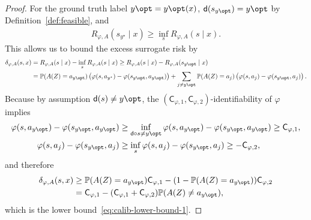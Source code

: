 \documentclass[11pt]{article}
\newcommand{\Prb}{\mathbb{P}}
\newcommand{\prn}[1]{\left({#1}\right)} %
\newcommand{\constant}{\mathsf{C}}  %
\newcommand{\pred}{\mathsf{d}}  %
\newcommand{\sloss}{\varphi}  %
\begin{document}
\begin{proof}
  For the ground truth label $y\opt = y\opt(x)$,
  $\pred(s_{y\opt}) = y\opt$ by Definition~\ref{def:feasible},
  and
  \begin{align*}
    R_{\varphi,A}(s_{y^\star} \mid x) \geq \inf_{s} R_{\varphi,A}(s \mid x).
  \end{align*} 
  This allows us to bound the excess surrogate risk by
  \begin{align*}
    \delta_{\sloss, A} (s, x)
    & = R_{\varphi,A}(s\mid x) - \inf_{s} R_{\varphi,A}(s \mid x)
    \geq R_{\varphi,A}(s\mid x) - R_{\varphi,A}(s_{y\opt} \mid x) \\
    & = \Prb(A(Z) = a_{y\opt}) \prn{\varphi(s, a_{y^\star}) -
      \varphi(s_{y\opt}, a_{y\opt})} + \sum_{j \neq y\opt}  \Prb(A(Z) = a_j) \prn{\varphi(s, a_j) - \varphi(s_{y\opt}, a_j)}.
  \end{align*}
  Because by assumption $\pred(s) \neq y\opt$, the $(\constant_{\sloss, 1},
  \constant_{\sloss, 2})$-identifiability of $\sloss$ implies
  \begin{align*}
    \varphi(s, a_{y\opt}) - \varphi(s_{y\opt}, a_{y\opt})
    & \geq  \inf_{\pred \circ s \neq y\opt} \sloss(s, a_{y\opt})  - \varphi(s_{y\opt}, a_{y\opt}) \geq \constant_{\sloss, 1}, \\
    \varphi(s, a_j) - \varphi(s_{y\opt}, a_j) &
    \geq \inf_{s} \sloss(s, a_j) - \sloss(s_{y\opt}, a_j)
    \geq -\constant_{\sloss, 2},
  \end{align*}
  and therefore
  \begin{align*}
    \delta_{\varphi, {A}} (s, x)
    & \geq \Prb(A(Z) = a_{y\opt}) \constant_{\sloss, 1} - (1 - \Prb(A(Z) = a_{y\opt})) \constant_{\sloss, 2} \\
    & = \constant_{\sloss, 1} - (\constant_{\sloss, 1} + \constant_{\sloss, 2})  \Prb(A(Z) \neq a_{y\opt}),
  \end{align*}
  which is the lower bound~\eqref{eq:calib-lower-bound-1}.
\end{proof}
\end{document}

